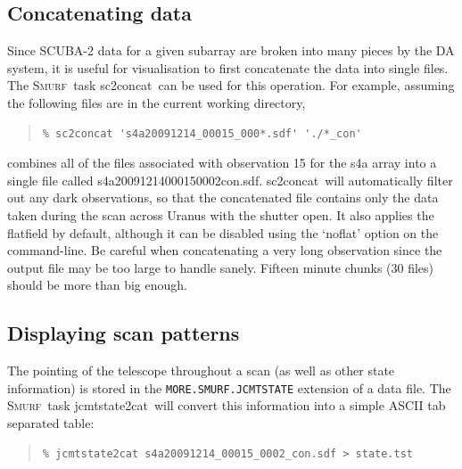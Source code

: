 \documentclass[twoside,11pt]{article}
\newcommand{\xref}[3]{#1}
\newcommand{\xlabel}[1]{}
\renewcommand{\_}{\texttt{\symbol{95}}}
\newenvironment{myquote}{\begin{quote}\begin{small}}{\end{small}\end{quote}}
\newcommand{\smurf}{\xref{\textsc{Smurf}}{sun258}{}}
\newcommand{\task}[1]{\textsf{#1}}
\newcommand{\concat}{\xref{\task{sc2concat}}{sun258}{SC2CONCAT}}
\newcommand{\jcmtstate}{\xref{\task{jcmtstate2cat}}{sun258}{JCMTSTATE2CAT}}
\begin{document}
\subsection{\xlabel{concat}Concatenating data}

Since SCUBA-2 data for a given subarray are broken into many pieces by
the DA system, it is useful for visualisation to first concatenate the
data into single files. The \smurf\ task \concat\ can be used for this
operation. For example, assuming the following files are in the
current working directory,

\begin{myquote}
\begin{verbatim}
% sc2concat 's4a20091214_00015_000*.sdf' './*_con'
\end{verbatim}
\end{myquote}

combines all of the files associated with observation 15 for the s4a
array into a single file called
s4a20091214\_00015\_0002\_con.sdf. \concat\ will automatically filter
out any dark observations, so that the concatenated file contains only
the data taken during the scan across Uranus with the shutter open. It
also applies the flatfield by default, although it can be disabled using
the `noflat' option on the command-line. Be careful when concatenating
a very long observation since the output file may be too large to
handle sanely. Fifteen minute chunks (30 files) should be more than
big enough.

\subsection{\xlabel{display_scan}Displaying scan patterns}

The pointing of the telescope throughout a scan (as well as other
state information) is stored in the \texttt{MORE.SMURF.JCMTSTATE}
extension of a data file. The \smurf\ task \jcmtstate\ will convert
this information into a simple ASCII tab separated table:

\begin{myquote}
\begin{verbatim}
% jcmtstate2cat s4a20091214_00015_0002_con.sdf > state.tst
\end{verbatim}
\end{myquote}
\end{document}
